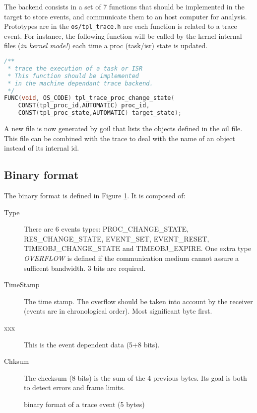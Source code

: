 The backend consists in a set of 7 functions that should be implemented in the target to store events, and communicate them to an host computer for analysis. Prototypes are in the \texttt{os/tpl_trace.h} are each function is related to a trace event. For instance, the following function will be called by the kernel internal files (\emph{in kernel mode!}) each time a proc (task/isr) state is updated.

\begin{lstlisting}[language=C]
/**
 * trace the execution of a task or ISR
 * This function should be implemented
 * in the machine dependant trace backend.
 */
FUNC(void, OS_CODE) tpl_trace_proc_change_state(
    CONST(tpl_proc_id,AUTOMATIC) proc_id,
    CONST(tpl_proc_state,AUTOMATIC) target_state);
\end{lstlisting}

A new file is now generated by goil  that lists the objects defined in the oil file. This file can be combined with the trace to deal with the name of an object instead of its internal id.


\subsection{Binary format}
\label{sec:traceBinFormat}

The binary format is defined in Figure \ref{fig:traceBin}. It is composed of:
\begin{description}
	\item[Type] There are 6 events types: PROC\_CHANGE\_STATE, RES\_CHANGE\_STATE, EVENT\_SET, EVENT\_RESET, TIMEOBJ\_CHANGE\_STATE and TIMEOBJ\_EXPIRE. One extra type \emph{OVERFLOW} is defined if the communication medium cannot assure a sufficent bandwidth. 3 bits are required.
	\item[TimeStamp] The time stamp. The overflow should be taken into account by the receiver (events are in chronological order). Most significant byte first.
	\item[xxx] This is the event dependent data (5+8 bits).
	\item[Chksum] The checksum (8 bits) is the sum of the 4 previous bytes. Its goal is both to detect errors and frame limits.
\end{description}

\begin{figure}[htbp]
    \centering
	\begin{adjustbox}{width=.8\linewidth,keepaspectratio}
		
	\end{adjustbox}
	\caption{binary format of a trace event (5 bytes)}
	\label{fig:traceBin}
\end{figure}

